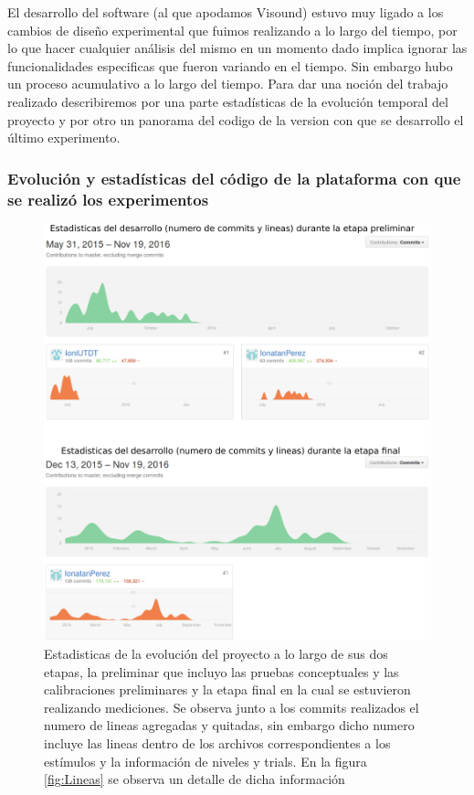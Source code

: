 \documentclass{article}
\begin{document}
    El desarrollo del software (al que apodamos Visound) estuvo muy ligado a los cambios de diseño experimental que fuimos realizando a lo largo del tiempo, por lo que hacer cualquier análisis del mismo en un momento dado implica ignorar las funcionalidades especificas que fueron variando en el tiempo. Sin embargo hubo un proceso acumulativo a lo largo del tiempo. Para dar una noción del trabajo realizado describiremos por una parte estadísticas de la evolución temporal del proyecto y por otro un panorama del codigo de la version con que se desarrollo el último experimento. 
    
    \subsubsection{Evolución y estadísticas del código de la plataforma con que se realizó los experimentos}
    
    \begin{figure}
        \center
        \includegraphics[width=\textwidth]{Imagenes/Commits.png}
        \caption{Estadisticas de la evolución del proyecto a lo largo de sus dos etapas, la preliminar que incluyo las pruebas conceptuales y las calibraciones preliminares y la etapa final en la cual se estuvieron realizando mediciones. Se observa junto a los commits realizados el numero de lineas agregadas y quitadas, sin embargo dicho numero incluye las lineas dentro de los archivos correspondientes a los estímulos y la información de niveles y trials. En la figura \ref{fig:Lineas} se observa un detalle de dicha información}
        \label{fig:Commits}
    \end{figure}
    
\end{document}
